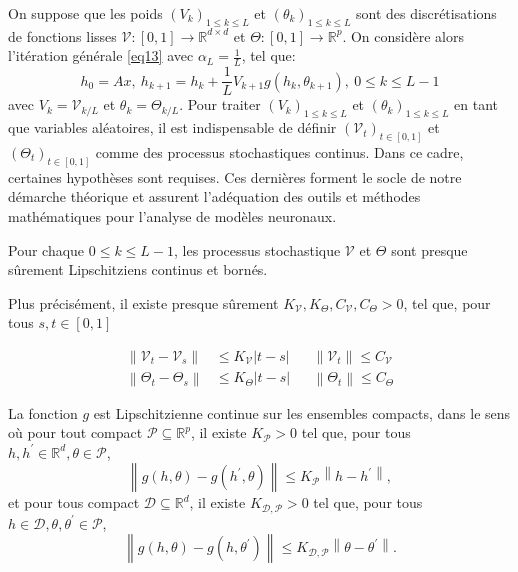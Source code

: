 On suppose que les poids $(V_k)_{1\leqslant k \leqslant L }$ et $(\theta_k)_{1\leqslant k \leqslant L }$ sont des discrétisations de fonctions lisses $\mathscr{V}:[0,1] \to \mathbb{R}^{d \times d}$ et $\Theta:[0,1] \to \mathbb{R}^{p}$. On considère alors l'itération générale \ref*{eq13} avec $\alpha_L = \frac{1}{L}$, tel que:
\begin{equation}\label{eq13}
    h_0 = Ax,\ h_{k+1} = h_k + \frac{1}{L}V_{k+1}g(h_k,\theta_{k+1}),\ 0 \leqslant k \leqslant L-1
\end{equation}
avec $V_k = \mathscr{V}_{k/L}$ et $\theta_k = \Theta_{k/L}$.
Pour traiter $(V_k)_{1\leqslant k \leqslant L}$ et $(\theta_k)_{1\leqslant k \leqslant L}$ en tant que variables aléatoires, il est indispensable de définir $(\mathscr{V}_t)_{t \in [0,1]}$ et $(\Theta_t)_{t \in [0,1]}$ comme des processus stochastiques continus. Dans ce cadre, certaines hypothèses sont requises. Ces dernières forment le socle de notre démarche théorique et assurent l'adéquation des outils et méthodes mathématiques pour l'analyse de modèles neuronaux.

\begin{assumption}\label{H5}
    Pour chaque $0 \leqslant k \leqslant L-1$, les processus stochastique $\mathscr{V}$ et $\Theta$ sont presque sûrement Lipschitziens continus et bornés.
\end{assumption}

Plus précisément, il existe presque sûrement $K_{\mathscr{V}}, K_{\Theta}, C_{\mathscr{V}}, C_{\Theta}>0$, tel que, pour tous $s, t \in [0,1]$

\begin{align*}
    \left\|\mathscr{V}_t-\mathscr{V}_s\right\| &\leqslant K_{\mathscr{V}}|t-s| 
    &&\left\|\mathscr{V}_t\right\| \leqslant C_{\mathscr{V}} \\
    \left\|\Theta_t-\Theta_s\right\| &\leqslant K_{\Theta}|t-s| 
    &&\left\|\Theta_t\right\| \leqslant C_{\Theta}
\end{align*}

\begin{assumption}\label{H6}
La fonction $g$ est Lipschitzienne continue sur les ensembles compacts, dans le sens où pour tout compact $\mathscr{P} \subseteq \mathbb{R}^p$, il existe $K_{\mathscr{P}} > 0$  tel que, pour tous $h, h^{\prime} \in \mathbb{R}^d, \theta \in \mathscr{P}$,
$$
    \left\|g(h, \theta)-g\left(h^{\prime}, \theta\right)\right\| \leqslant K_{\mathscr{P}}\left\|h-h^{\prime}\right\|,
$$
et pour tous compact $\mathscr{D} \subseteq \mathbb{R}^d$, il existe $K_{\mathscr{D}, \mathscr{P}}>0$ tel que, pour tous $h \in \mathscr{D}, \theta, \theta^{\prime} \in \mathscr{P}$,
$$
    \left\|g(h, \theta)-g\left(h, \theta^{\prime}\right)\right\| \leqslant K_{\mathscr{D}, \mathscr{P}}\left\|\theta-\theta^{\prime}\right\| .
$$
\end{assumption}


